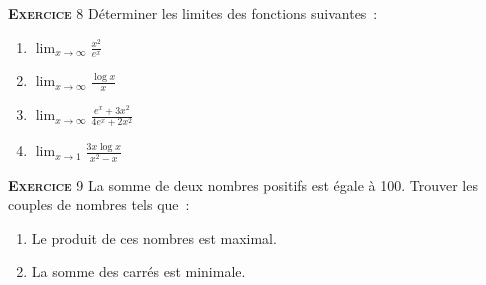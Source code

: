 \documentclass[10pt,a4paper,notitlepage]{article}
\newcommand{\exercice}[1]{\textsc{\textbf{Exercice}} #1}
\begin{document}
\bigskip

\exercice{8} Déterminer les limites des fonctions suivantes :
\begin{enumerate}
\item $\lim_{x\rightarrow\infty} \frac{x^2}{e^x}$
\item $\lim_{x\rightarrow\infty} \frac{\log x}{x}$
\item $\lim_{x\rightarrow\infty} \frac{e^x+3x^2}{4e^x+2x^2}$
\item $\lim_{x\rightarrow 1} \frac{3x\log x}{x^2-x}$
\end{enumerate}

\bigskip

\exercice{9} La somme de deux nombres positifs est égale à
100. Trouver les couples de nombres tels que :
\begin{enumerate}
\item Le produit de ces nombres est maximal.
\item La somme des carrés est minimale.
\end{enumerate}
\end{document}
